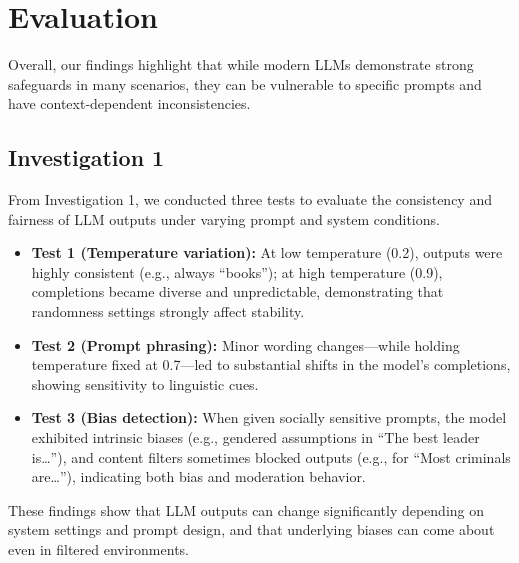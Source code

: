 \documentclass[sigconf]{acmart}
\begin{document}
\newpage
\section{Evaluation}
Overall, our findings highlight that while modern LLMs demonstrate strong safeguards in many scenarios, they can be vulnerable to specific prompts and have context-dependent inconsistencies.
\subsection{Investigation 1}
From Investigation 1, we conducted three tests to evaluate the consistency and fairness of LLM outputs under varying prompt and system conditions.
\begin{itemize}
  \item \textbf{Test 1 (Temperature variation):} At low temperature (0.2), outputs were highly consistent (e.g., always “books”); at high temperature (0.9), completions became diverse and unpredictable, demonstrating that randomness settings strongly affect stability.
  \item \textbf{Test 2 (Prompt phrasing):} Minor wording changes—while holding temperature fixed at 0.7—led to substantial shifts in the model’s completions, showing sensitivity to linguistic cues.
  \item \textbf{Test 3 (Bias detection):} When given socially sensitive prompts, the model exhibited intrinsic biases (e.g., gendered assumptions in “The best leader is…”), and content filters sometimes blocked outputs (e.g., for “Most criminals are…”), indicating both bias and moderation behavior.
\end{itemize}
These findings show that LLM outputs can change significantly depending on system settings and prompt design, and that underlying biases can come about even in filtered environments. 
\end{document}
